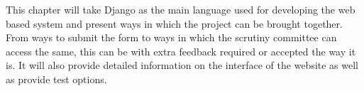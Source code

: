 \documentclass[../main.tex]{subfiles}
\begin{document}
\raggedright
This chapter will take Django as the main language used for developing the web based system and present ways in which the project can be brought together. From ways to submit the form to ways in which the scrutiny committee can access the same, this can be with extra feedback required or accepted the way it is. It will also provide detailed information on the interface of the website as well as provide test options.
\end{document}
